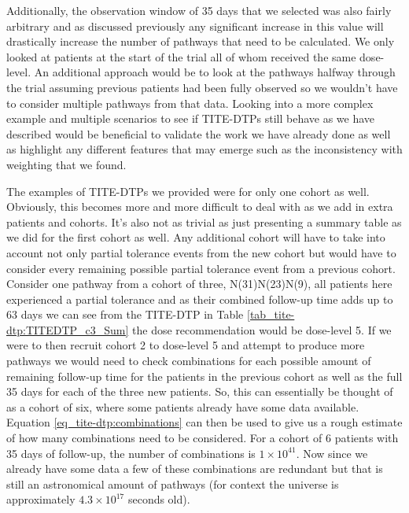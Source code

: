 Additionally, the observation window of 35 days that we selected was also fairly arbitrary and as discussed previously any significant increase in this value will drastically increase the number of pathways that need to be calculated. We only looked at patients at the start of the trial all of whom received the same dose-level. An additional approach would be to look at the pathways halfway through the trial assuming previous patients had been fully observed so we wouldn't have to consider multiple pathways from that data. Looking into a more complex example and multiple scenarios to see if TITE-DTPs still behave as we have described would be beneficial to validate the work we have already done as well as highlight any different features that may emerge such as the inconsistency with weighting that we found.

The examples of TITE-DTPs we provided were for only one cohort as well. Obviously, this becomes more and more difficult to deal with as we add in extra patients and cohorts. It's also not as trivial as just presenting a summary table as we did for the first cohort as well. Any additional cohort will have to take into account not only partial tolerance events from the new cohort but would have to consider every remaining possible partial tolerance event from a previous cohort. Consider one pathway from a cohort of three, N(31)N(23)N(9), all patients here experienced a partial tolerance and as their combined follow-up time adds up to 63 days we can see from the TITE-DTP in Table \ref{tab_tite-dtp:TITEDTP_c3_Sum} the dose recommendation would be dose-level 5. If we were to then recruit cohort 2 to dose-level 5 and attempt to produce more pathways we would need to check combinations for each possible amount of remaining follow-up time for the patients in the previous cohort as well as the full 35 days for each of the three new patients. So, this can essentially be thought of as a cohort of six, where some patients already have some data available. Equation \ref{eq_tite-dtp:combinations} can then be used to give us a rough estimate of how many combinations need to be considered. For a cohort of 6 patients with 35 days of follow-up, the number of combinations is $1 \times 10^{41}$. Now since we already have some data a few of these combinations are redundant but that is still an astronomical amount of pathways (for context the universe is approximately $4.3 \times 10^{17}$ seconds old). 


